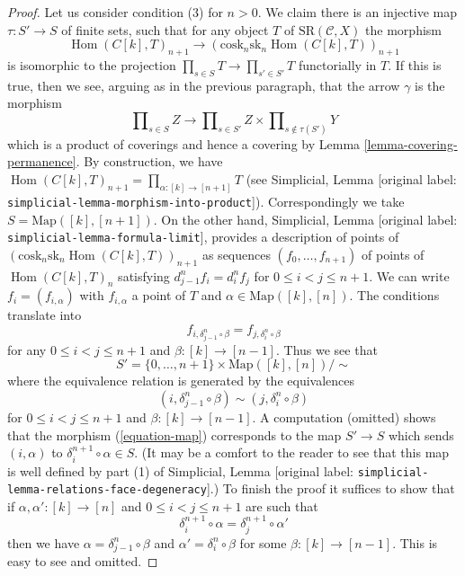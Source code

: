 \documentclass[10pt,a4paper]{article}
\theoremstyle{plain}
\theoremstyle{definition}
\theoremstyle{remark}
\numberwithin{equation}{subsection}
\def\Hom{\mathop{\mathrm{Hom}}\nolimits}
\begin{document}
\begin{proof}
\medskip\noindent
Let us consider condition (3) for $n > 0$. We claim there is an
injective map $\tau : S' \to S$ of finite sets, such that for any
object $T$ of $\text{SR}(\mathcal{C}, X)$ the morphism
\begin{equation}
\label{equation-map}
\Hom(C[k], T)_{n + 1} \to
(\text{cosk}_n \text{sk}_n \Hom(C[k], T))_{n + 1}
\end{equation}
is isomorphic to the projection $\prod_{s \in S} T \to \prod_{s' \in S'} T$
functorially in $T$. If this is true, then we see, arguing as in the previous
paragraph, that the arrow $\gamma$ is the morphism
$$
\prod\nolimits_{s \in S} Z
\longrightarrow
\prod\nolimits_{s \in S'} Z
\times
\prod\nolimits_{s \not\in \tau(S')} Y
$$
which is a product of coverings and hence a covering by
Lemma \ref{lemma-covering-permanence}. By construction, we have
$\Hom(C[k], T)_{n + 1} = \prod_{\alpha : [k] \to [n + 1]} T$
(see Simplicial, Lemma \textnormal{[original label: \nolinkurl{simplicial-lemma-morphism-into-product}]}).
Correspondingly we take $S = \text{Map}([k], [n + 1])$.
On the other hand, Simplicial, Lemma \textnormal{[original label: \nolinkurl{simplicial-lemma-formula-limit}]},
provides a description of points of
$(\text{cosk}_n \text{sk}_n \Hom(C[k], T))_{n + 1}$
as sequences $(f_0, \ldots, f_{n + 1})$ of points of $\Hom(C[k], T)_n$
satisfying $d^n_{j - 1} f_i = d^n_i f_j$ for $0 \leq i < j \leq n + 1$.
We can write $f_i = (f_{i, \alpha})$ with $f_{i, \alpha}$ a point of $T$
and $\alpha \in \text{Map}([k], [n])$. The conditions translate into
$$
f_{i, \delta^n_{j - 1} \circ \beta} = f_{j, \delta_i^n \circ \beta}
$$
for any $0 \leq i < j \leq n + 1$ and $\beta : [k] \to [n - 1]$. Thus we
see that
$$
S' = \{0, \ldots, n + 1\} \times \text{Map}([k], [n]) / \sim
$$
where the equivalence relation is generated by the equivalences
$$
(i, \delta^n_{j - 1} \circ \beta) \sim (j, \delta_i^n \circ \beta)
$$
for $0 \leq i < j \leq n + 1$ and $\beta : [k] \to [n - 1]$.
A computation (omitted) shows that the morphism (\ref{equation-map})
corresponds to the map $S' \to S$ which sends $(i, \alpha)$ to
$\delta^{n + 1}_i \circ \alpha \in S$. (It may be a comfort to the
reader to see that this map is well defined by part (1) of
Simplicial, Lemma \textnormal{[original label: \nolinkurl{simplicial-lemma-relations-face-degeneracy}]}.)
To finish the proof it suffices to show that if
$\alpha, \alpha' : [k] \to [n]$ and $0 \leq i < j \leq n + 1$
are such that
$$
\delta^{n + 1}_i \circ \alpha = \delta^{n + 1}_j \circ \alpha'
$$
then we have $\alpha = \delta^n_{j - 1} \circ \beta$
and $\alpha' = \delta_i^n \circ \beta$ for some $\beta : [k] \to [n - 1]$.
This is easy to see and omitted.
\end{proof}
\end{document}
